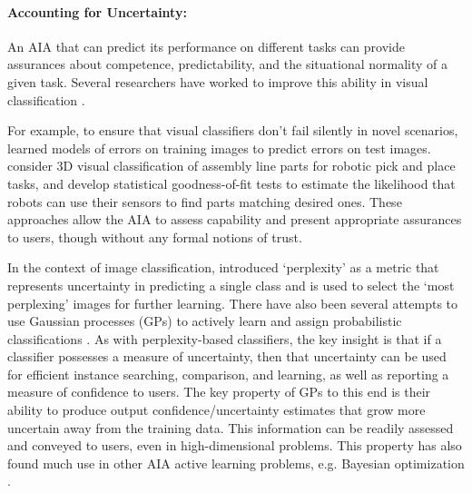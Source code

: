 \paragraph{Accounting for Uncertainty:} \label{sec:acct_uncertainty}
An AIA that can predict its performance on different tasks can provide assurances about competence, predictability, and the situational normality of a given task. Several researchers have worked to improve this ability in visual classification \cite{Zhang2014-he,Gurau2016-hs,Churchill2015-ei,Kaipa2015-hy}. 

For example, to ensure that visual classifiers don't fail silently in novel scenarios, \citet{Zhang2014-he} learned models of errors on training images to predict errors on test images. \citet{Kaipa2015-hy} consider 3D visual classification of assembly line parts for robotic pick and place tasks, and develop statistical goodness-of-fit tests to estimate the likelihood that robots can use their sensors to find parts matching desired ones. These approaches allow the AIA to assess capability and present appropriate assurances to users, though without any formal notions of trust. 

In the context of image classification, \citet{Paul2011-vr} introduced `perplexity' as a metric that represents uncertainty in predicting a single class and is used to select the `most perplexing' images for further learning. There have also been several attempts to use Gaussian processes (GPs) to actively learn and assign probabilistic classifications \cite{MacKay1992-sp,Triebel2016-kj,Triebel2013-ow,Triebel2013-ku,Grimmett2013-gj,Grimmett2016-yc,Berczi2015-rd,Dequaire2016-kh}. As with perplexity-based classifiers, the key insight is that if a classifier possesses a measure of uncertainty, then that uncertainty can be used for efficient instance searching, comparison, and learning, as well as reporting a measure of confidence to users. The key property of GPs to this end is their ability to produce output confidence/uncertainty estimates that grow more uncertain away from the training data. This information can be readily assessed and conveyed to users, even in high-dimensional problems. This property has also found much use in other AIA active learning problems, e.g. Bayesian optimization \cite{Snoek2012-tt, Brochu2010-tj,Israelsen2017-zb}.

